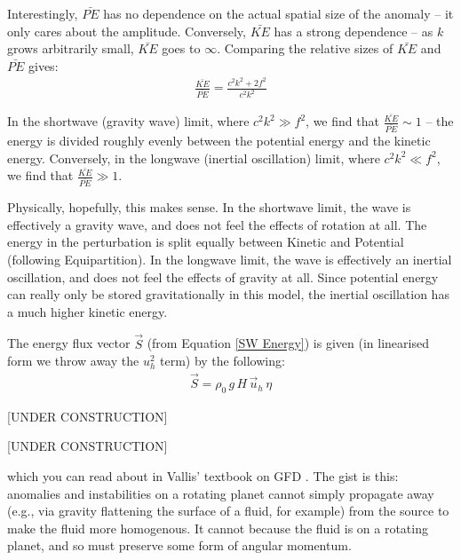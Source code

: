 Interestingly, \(\bar{PE}\) has no dependence on the actual spatial size of the anomaly -- it only cares about the amplitude. Conversely, \(\bar{KE}\) has a strong dependence -- as \(k\) grows arbitrarily small, \(\bar{KE}\) goes to \(\infty\). Comparing the relative sizes of \(\bar{KE}\) and \(\bar{PE}\) gives:
\begin{align*}
    \frac{\bar{KE}}{\bar{PE}}=\frac{c^2k^2+2f^2}{c^2k^2}
\end{align*}

In the shortwave (gravity wave) limit, where \(c^2k^2\gg f^2\), we find that \(\frac{\bar{KE}}{\bar{PE}}\sim 1\) -- the energy is divided roughly evenly between the potential energy and the kinetic energy. Conversely, in the longwave (inertial oscillation) limit, where \(c^2k^2\ll f^2\), we find that \(\frac{\bar{KE}}{\bar{PE}}\gg 1\).

Physically, hopefully, this makes sense. In the shortwave limit, the wave is effectively a gravity wave, and does not feel the effects of rotation at all. The energy in the perturbation is split equally between Kinetic and Potential (following Equipartition). In the longwave limit, the wave is effectively an inertial oscillation, and does not feel the effects of gravity at all. Since potential energy can really only be stored gravitationally in this model, the inertial oscillation has a much higher kinetic energy.

The energy flux vector \(\vec{S}\) (from Equation \ref{SW Energy}) is given (in linearised form we throw away the \(u_h^2\) term) by the following:
\begin{align*}
    \vec{S}=\rho_0\,g\,H\,\vec{u}_h\,\eta
\end{align*}

[UNDER CONSTRUCTION]


[UNDER CONSTRUCTION]

which you can read about in Vallis' textbook on GFD \cite{Vallis}. The gist is this: anomalies and instabilities on a rotating planet cannot simply propagate away (e.g., via gravity flattening the surface of a fluid, for example) from the source to make the fluid more homogenous. It cannot because the fluid is on a rotating planet, and so must preserve some form of angular momentum.

